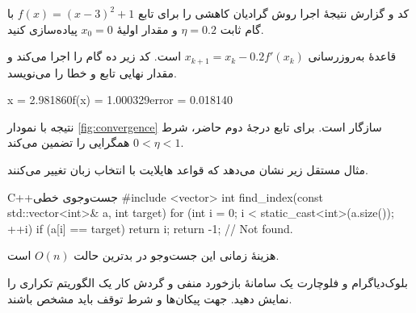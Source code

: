 \documentclass[\AssignmentBaseSize,a4paper]{article}
\begin{document}
\newpage
\begin{problem}[۲۰ نمره]{کد و گزارش نتیجهٔ اجرا}\label{prob:code}
  روش گرادیان کاهشی را برای تابع $f(x)=(x-3)^2+1$ با گام ثابت
  $\eta=0.2$ و مقدار اولیهٔ $x_0=0$ پیاده‌سازی کنید.
\end{problem}
\begin{solution}
  قاعدهٔ به‌روزرسانی $x_{k+1}=x_k-0.2f'(x_k)$ است.
  کد زیر ده گام را اجرا می‌کند و مقدار نهایی تابع و خطا را می‌نویسد.
  \begin{answerbox}
    \begin{latin}\codefont\small
      x = 2.981860\quad f(x) = 1.000329\quad error = 0.018140
    \end{latin}
  \end{answerbox}
  نتیجه با نمودار \ref{fig:convergence} سازگار است. برای تابع درجهٔ دوم حاضر،
  شرط $0<\eta<1$ همگرایی را تضمین می‌کند.

  مثال مستقل زیر نشان می‌دهد که قواعد هایلایت با انتخاب زبان تغییر می‌کنند.
\begin{codeblock}{C++}{جست‌وجوی خطی}
#include <vector>
int find_index(const std::vector<int>& a, int target) {
    for (int i = 0; i < static_cast<int>(a.size()); ++i)
        if (a[i] == target) return i;
    return -1;  // Not found.
}
\end{codeblock}
  هزینهٔ زمانی این جست‌وجو در بدترین حالت $O(n)$ است.
\end{solution}
\newpage
\begin{problem}[۲۰ نمره]{بلوک‌دیاگرام و فلوچارت}\label{prob:diagram}
  یک سامانهٔ بازخورد منفی و گردش کار یک الگوریتم تکراری را نمایش دهید.
  جهت پیکان‌ها و شرط توقف باید مشخص باشند.
\end{problem}
\end{document}

